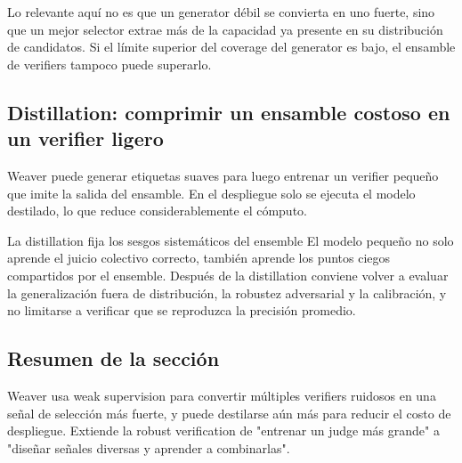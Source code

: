 
Lo relevante aquí no es que un generator débil se convierta en uno fuerte, sino que un mejor selector extrae más de la capacidad ya presente en su distribución de candidatos. Si el límite superior del coverage del generator es bajo, el ensamble de verifiers tampoco puede superarlo.

\subsection{Distillation: comprimir un ensamble costoso en un verifier ligero}

Weaver puede generar etiquetas suaves para luego entrenar un verifier pequeño que imite la salida del ensamble. En el despliegue solo se ejecuta el modelo destilado, lo que reduce considerablemente el cómputo.



\begin{warningbox}{La distillation fija los sesgos sistemáticos del ensemble}
El modelo pequeño no solo aprende el juicio colectivo correcto, también aprende los puntos ciegos compartidos por el ensemble. Después de la distillation conviene volver a evaluar la generalización fuera de distribución, la robustez adversarial y la calibración, y no limitarse a verificar que se reproduzca la precisión promedio.
\end{warningbox}

\subsection{Resumen de la sección}

Weaver usa weak supervision para convertir múltiples verifiers ruidosos en una señal de selección más fuerte, y puede destilarse aún más para reducir el costo de despliegue. Extiende la robust verification de "entrenar un judge más grande" a "diseñar señales diversas y aprender a combinarlas".
